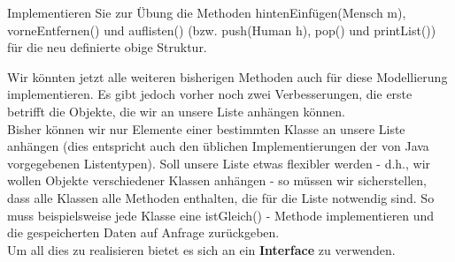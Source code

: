\documentclass{article}
\begin{document}
\begin{task}{1}
    Implementieren Sie zur Übung die Methoden hintenEinfügen(Mensch m), vorneEntfernen() und auflisten() (bzw. push(Human h), pop() und printList()) für die neu definierte obige Struktur.
\end{task}

\vspace{2cm}

Wir könnten jetzt alle weiteren bisherigen Methoden auch für diese Modellierung implementieren. Es gibt jedoch vorher noch zwei Verbesserungen, die erste betrifft die Objekte, die wir an unsere Liste anhängen können. \\
Bisher können wir nur Elemente einer bestimmten Klasse an unsere Liste anhängen (dies entspricht auch den üblichen Implementierungen der von Java vorgegebenen Listentypen). Soll unsere Liste etwas flexibler werden - d.h., wir wollen Objekte verschiedener Klassen anhängen - so müssen wir sicherstellen, dass alle Klassen alle Methoden enthalten, die für die Liste notwendig sind. So muss beispielsweise jede Klasse eine istGleich() - Methode implementieren und die gespeicherten Daten auf Anfrage zurückgeben. \\
Um all dies zu realisieren bietet es sich an ein \textbf{Interface} zu verwenden. \\
\end{document}
